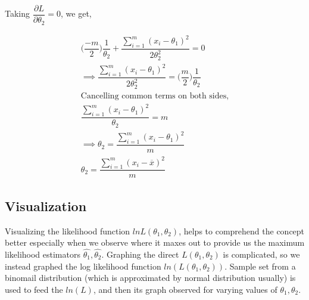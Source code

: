 \documentclass[float=false,crop=false]{standalone}
\begin{document}
    Taking \(\dfrac{\partial L}{\partial \theta_2} = 0\), we get,

\begin{equation}\begin{aligned}
\bigg( \dfrac{-m}{2} \bigg) \dfrac{1}{\theta_2} + \dfrac{ \sum_{i=1}^m(x_i-\theta_1)^2}{2\theta_2^2} = 0  \\
\implies \dfrac{ \sum_{i=1}^m(x_i-\theta_1)^2}{2\theta_2^2} = \bigg( \dfrac{m}{2} \bigg) \dfrac{1}{\theta_2} \\
\text{Cancelling common terms on both sides,} \\
\dfrac{ \sum_{i=1}^m(x_i-\theta_1)^2}{\theta_2} = m \\
\implies \theta_2 = \dfrac{ \sum_{i=1}^m(x_i-\theta_1)^2}{m} \\
\theta_2 = \dfrac{ \sum_{i=1}^m(x_i-\overline{x})^2}{m} \label{eq:M016}
\end{aligned}\end{equation}

    \subsection{Visualization}\label{visualization}

Visualizing the likelihood function \(ln L(\theta_1,\theta_2)\), helps
to comprehend the concept better especially when we observe where it
maxes out to provide us the maximum likelihood estimators
\(\hat{\theta_1},\hat{\theta_2}\). Graphing the direct
\(L(\theta_1,\theta_2)\) is complicated, so we instead graphed the log
likelihood function \(ln (L(\theta_1,\theta_2))\). Sample set from a
binomail distribution (which is approximated by normal distribution
usually) is used to feed the \(ln(L)\), and then its graph observed for
varying values of \(\theta_1,\theta_2\).
\end{document}
